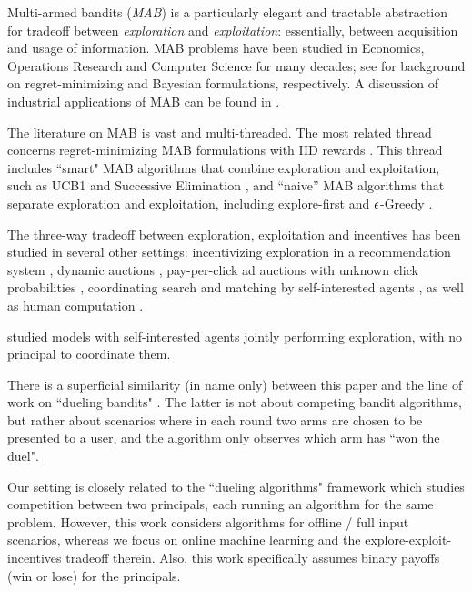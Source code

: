 Multi-armed bandits (\emph{MAB}) is a particularly elegant and tractable abstraction for tradeoff between \emph{exploration} and \emph{exploitation}: essentially, between acquisition and usage of information. MAB problems have been studied in Economics, Operations Research and Computer Science for many decades; see \citep{Bubeck-survey12,Gittins-book11,slivkins-MABbook} for background on regret-minimizing and Bayesian formulations, respectively. A discussion of industrial applications of MAB can be found in \citet{MWT-WhitePaper-2016}.

The literature on MAB is vast and multi-threaded. The most related
thread concerns regret-minimizing MAB formulations with IID rewards
\citep{Lai-Robbins-85,bandits-ucb1}. This thread includes ``smart" MAB
algorithms that combine exploration and exploitation, such as UCB1
\citep{bandits-ucb1} and Successive Elimination
\citep{EvenDar-icml06}, and ``naive'' MAB algorithms that separate
exploration and exploitation, including explore-first and
$\epsilon$-Greedy \citep[\eg see][]{slivkins-MABbook}.

The three-way tradeoff between exploration, exploitation and incentives has been studied in several other settings:
incentivizing exploration in a recommendation system
    \citep{Che-13,Frazier-ec14,Kremer-JPE14,ICexploration-ec15,Bimpikis-exploration-ms17,Bahar-ec16,ICexplorationGames-ec16-working},
dynamic auctions
    \cite[\eg][]{AtheySegal-econometrica13,DynPivot-econometrica10,Kakade-pivot-or13},
pay-per-click ad auctions with unknown click probabilities
    \cite[\eg][]{MechMAB-ec09,DevanurK09,Transform-ec10-jacm},
coordinating search and matching by self-interested agents
    \citep{Bobby-Glen-ec16},
as well as human computation
    \cite[\eg][]{RepeatedPA-ec14,Ghosh-itcs13,Krause-www13}.

\citet{Bolton-econometrica99,Keller-econometrica05,Johari-ec12} studied models with self-interested agents jointly performing exploration, with no principal to coordinate them.

There is a superficial similarity (in name only) between this paper and the line of work on ``dueling bandits"
    \citep[\eg][]{Yue-dueling12,Yue-dueling-icml09}.
The latter is not about competing bandit algorithms, but rather about scenarios where in each round two arms are chosen to be presented to a user, and the algorithm only observes which arm has ``won the duel".

Our setting is closely related to the ``dueling algorithms" framework \citep{DuelingAlgs-stoc11} which studies competition between two principals, each running an algorithm for the same problem. However, this work considers algorithms for offline / full input scenarios, whereas we focus on online machine learning and the explore-exploit-incentives tradeoff therein. Also, this work specifically assumes binary payoffs (\ie win or lose) for the principals.

